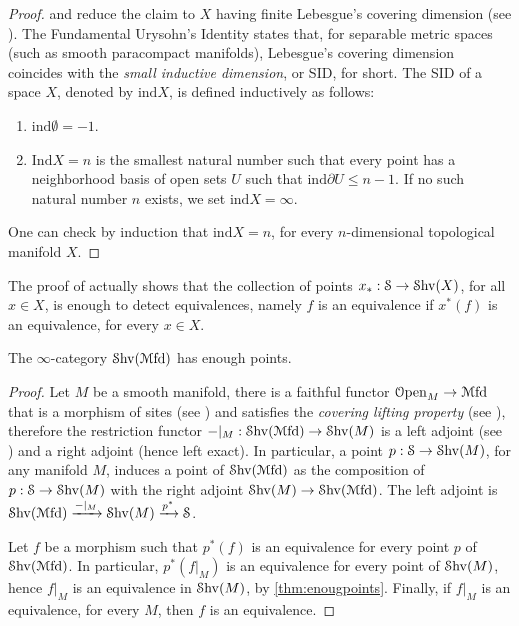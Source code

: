\documentclass[10pt]{amsart}
\begin{document}
\begin{proof}
	\cite[Corollary 7.2.1.17]{lurie2009htt} and \cite[Theorem 7.2.3.6]{lurie2009htt} reduce the claim to $X$ having finite Lebesgue's covering dimension (see \cite[Definition 7.2.3.1]{lurie2009htt}). The Fundamental Urysohn's Identity states that, for separable metric spaces (such as smooth paracompact manifolds), Lebesgue's covering dimension coincides with the \emph{small inductive dimension}, or SID, for short. The SID of a space $X$, denoted by $\mathrm{ind}X$, is defined inductively as follows: 
	\begin{enumerate}
		\item $\mathrm{ind}\emptyset=-1$.
		\item $\mathrm{Ind}X=n$ is the smallest natural number such that every point has a neighborhood basis of open sets $U$ such that $\mathrm{ind}\partial U\leq n-1$. If no such natural number $n$ exists, we set $\mathrm{ind}X=\infty$.
	\end{enumerate}One can check by induction that $\mathrm{ind} X=n$, for every $n$-dimensional topological manifold $X$.
\end{proof}
\begin{remark}\label{rmk:geopoints}
	The proof of \cite[Corollary 7.2.1.17]{lurie2009htt} actually shows that the collection of points $x_*:\mathcal{S}\to\mathcal{S}\mathrm{hv}(X)$, for all $x\in X$, is enough to detect equivalences, namely $f$ is an equivalence if $x^*(f)$ is an equivalence, for every $x\in X$. 
\end{remark}
\begin{theorem}\label{thm:mfdenoughpoints}
	The $\infty$-category $\mathcal{S}\mathrm{hv}(\mathcal{M}\mathrm{fd})$ has enough points. 
\end{theorem}
\begin{proof}
	Let $M$ be a smooth manifold, there is a faithful functor $\mathcal{O}\mathrm{pen}_M\to\mathcal{M}\mathrm{fd}$ that is a morphism of sites (see \cite[Definition A.10]{pstragowski2022syntheticspectracellularmotivic}) and satisfies the \emph{covering lifting property} (see \cite[Definition A.12]{pstragowski2022syntheticspectracellularmotivic}), therefore the restriction functor $-|_{M}:\mathcal{S}\mathrm{hv}(\mathcal{M}\mathrm{fd})\to\mathcal{S}\mathrm{hv}(M)$ is a left adjoint (see \cite[Proposition A.13]{pstragowski2022syntheticspectracellularmotivic}) and a right adjoint (hence left exact). In particular, a point $p:\mathcal{S}\to\mathcal{S}\mathrm{hv}(M)$, for any manifold $M$, induces a point of $\mathcal{S}\mathrm{hv}(\mathcal{M}\mathrm{fd})$ as the composition of $p:\mathcal{S}\to\mathcal{S}\mathrm{hv}(M)$ with the right adjoint $\mathcal{S}\mathrm{hv}(M)\to\mathcal{S}\mathrm{hv}(\mathcal{M}\mathrm{fd})$. The left adjoint is $\mathcal{S}\mathrm{hv}(\mathcal{M}\mathrm{fd})\xrightarrow{-|_M}\mathcal{S}\mathrm{hv}(M)\xrightarrow{p^*}\mathcal{S}$. 
	
	Let $f$ be a morphism such that $p^*(f)$ is an equivalence for every point $p$ of $\mathcal{S}\mathrm{hv}(\mathcal{M}\mathrm{fd})$. In particular, $p^*(f|_M)$ is an equivalence for every point of $\mathcal{S}\mathrm{hv}(M)$, hence $f|_M$ is an equivalence in $\mathcal{S}\mathrm{hv}(M)$, by \cref{thm:enougpoints}. Finally, if $f|_M$ is an equivalence, for every $M$, then $f$ is an equivalence. 
\end{proof}
\end{document}
